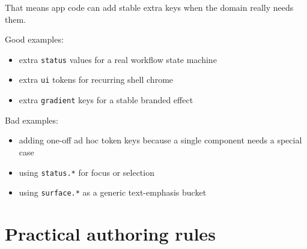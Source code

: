 That means app code can add stable extra keys when the domain really needs them.

Good examples:

\begin{itemize}
\tightlist
\item
  extra \texttt{s\allowbreak{}t\allowbreak{}a\allowbreak{}t\allowbreak{}u\allowbreak{}s} values for a real workflow state machine
\item
  extra \texttt{u\allowbreak{}i} tokens for recurring shell chrome
\item
  extra \texttt{g\allowbreak{}r\allowbreak{}a\allowbreak{}d\allowbreak{}i\allowbreak{}e\allowbreak{}n\allowbreak{}t} keys for a stable branded effect
\end{itemize}

Bad examples:

\begin{itemize}
\tightlist
\item
  adding one-off ad hoc token keys because a single component needs a special case
\item
  using \texttt{s\allowbreak{}t\allowbreak{}a\allowbreak{}t\allowbreak{}u\allowbreak{}s\allowbreak{}.\allowbreak{}*} for focus or selection
\item
  using \texttt{s\allowbreak{}u\allowbreak{}r\allowbreak{}f\allowbreak{}a\allowbreak{}c\allowbreak{}e\allowbreak{}.\allowbreak{}*} as a generic text-emphasis bucket
\end{itemize}

\section{Practical authoring rules}\label{record-026-practical-authoring-rules}

